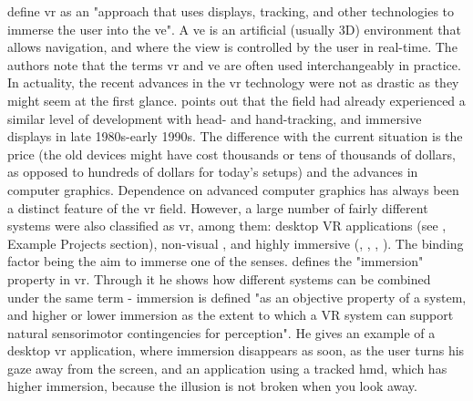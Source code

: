 \parencite{jr_3d_2017} define \gls{vr} as an "approach that uses displays, tracking, and other technologies to immerse the user into the \gls{ve}". A \gls{ve} is an artificial (usually 3D) environment that allows navigation, and where the view is controlled by the user in real-time. The authors note that the terms \gls{vr} and \gls{ve} are often used interchangeably in practice. 
In actuality, the recent advances in the \gls{vr} technology were not as drastic as they might seem at the first glance. \parencite{slater_immersion_2018} points out that the field had already experienced a similar level of development with head- and hand-tracking, and immersive displays in late 1980s-early 1990s. The difference with the current situation is the price (the old devices might have cost thousands or tens of thousands of dollars, as opposed to hundreds of dollars for today's setups) and the advances in computer graphics.
Dependence on advanced computer graphics has always been a distinct feature of the \gls{vr} field. However, a large number of fairly different systems were also classified as \gls{vr}, among them: desktop VR applications (see \parencite{churchill_collaborative_1998}, Example Projects section), non-visual \parencite{ammi_intermodal_2015}, and highly immersive (\parencite{davidson_greenspace_1996}, \parencite{greenwald_cocoverse_nodate}, \parencite{lena_real-time_nodate}, \parencite{kulik_virtual_2018}). The binding factor being the aim to immerse one of the senses. \parencite{slater_immersion_2018} defines the "immersion" property in \gls{vr}. Through it he shows how different systems can be combined under the same term - immersion is defined "as an objective property of a system, and higher or lower immersion as the extent to which a VR system can support natural sensorimotor contingencies for perception". He gives an example of a desktop \gls{vr} application, where immersion disappears as soon, as the user turns his gaze away from the screen, and an application using a tracked \gls{hmd}, which has higher immersion, because the illusion is not broken when you look away.



